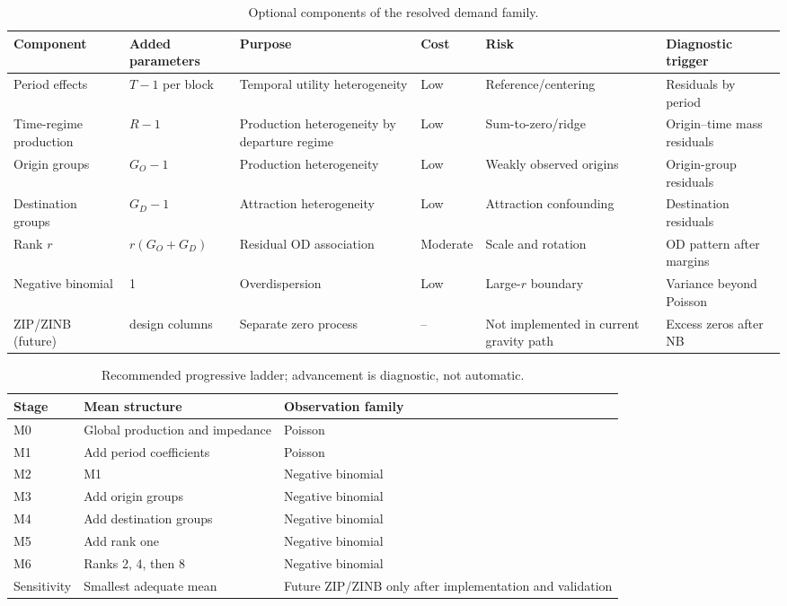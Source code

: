 \begin{table}[htbp]
\centering\scriptsize
\setlength{\tabcolsep}{3pt}
\begin{tabular}{p{2cm}p{1.7cm}p{2.6cm}p{1.4cm}p{2.1cm}p{2.4cm}}
\hline
Component & Added parameters & Purpose & Cost & Risk & Diagnostic trigger\\
\hline
Period effects & $T-1$ per block & Temporal utility heterogeneity & Low & Reference/centering & Residuals by period\\
Time-regime production & $R-1$ & Production heterogeneity by departure regime & Low & Sum-to-zero/ridge & Origin--time mass residuals\\
Origin groups & $G_O-1$ & Production heterogeneity & Low & Weakly observed origins & Origin-group residuals\\
Destination groups & $G_D-1$ & Attraction heterogeneity & Low & Attraction confounding & Destination residuals\\
Rank $r$ & $r(G_O+G_D)$ & Residual OD association & Moderate & Scale and rotation & OD pattern after margins\\
Negative binomial & 1 & Overdispersion & Low & Large-$r$ boundary & Variance beyond Poisson\\
ZIP/ZINB (future) & design columns & Separate zero process & -- & Not implemented in current gravity path & Excess zeros after NB\\
\hline
\end{tabular}
\caption{Optional components of the resolved demand family.}
\end{table}

\begin{table}[htbp]
\centering\small
\begin{tabular}{lll}
\hline
Stage & Mean structure & Observation family\\
\hline
M0 & Global production and impedance & Poisson\\
M1 & Add period coefficients & Poisson\\
M2 & M1 & Negative binomial\\
M3 & Add origin groups & Negative binomial\\
M4 & Add destination groups & Negative binomial\\
M5 & Add rank one & Negative binomial\\
M6 & Ranks 2, 4, then 8 & Negative binomial\\
Sensitivity & Smallest adequate mean & Future ZIP/ZINB only after implementation and validation\\
\hline
\end{tabular}
\caption{Recommended progressive ladder; advancement is diagnostic, not automatic.}
\end{table}

